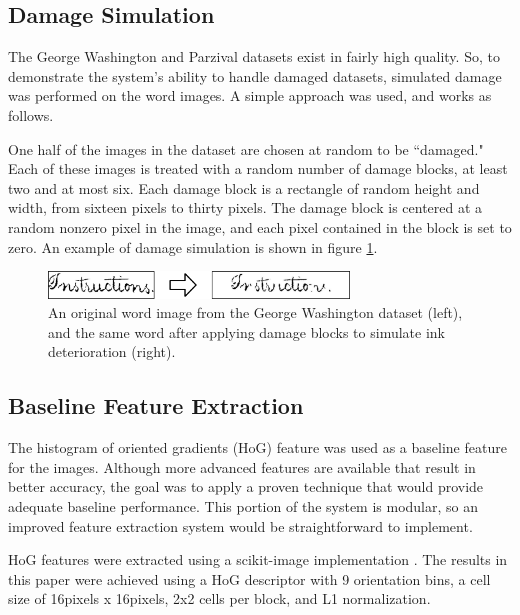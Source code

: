 \documentclass[final]{ukthesis}
\begin{document}
\subsection{Damage Simulation}
The George Washington and Parzival datasets exist in fairly high quality. So, to demonstrate the system's ability to handle damaged datasets, simulated damage was performed on the word images. A simple approach was used, and works as follows.

One half of the images in the dataset are chosen at random to be ``damaged." Each of these images is treated with a random number of damage blocks, at least two and at most six. Each damage block is a rectangle of random height and width, from sixteen pixels to thirty pixels. The damage block is centered at a random nonzero pixel in the image, and each pixel contained in the block is set to zero. An example of damage simulation is shown in figure \ref{fig:damage-simulation}.

\begin{figure}[h]
\begin{center}
\includegraphics[width=8cm]{damage-simulation}
\end{center}
\caption{An original word image from the George Washington dataset (left), and the same word after applying damage blocks to simulate ink deterioration (right).}
\label{fig:damage-simulation}
\end{figure}


\subsection{Baseline Feature Extraction}
The histogram of oriented gradients (HoG) feature was used as a baseline feature for the images. Although more advanced features are available that result in better accuracy, the goal was to apply a proven technique that would provide adequate baseline performance. This portion of the system is modular, so an improved feature extraction system would be straightforward to implement.

HoG features were extracted using a scikit-image implementation \cite{van2014scikit}. The results in this paper were achieved using a HoG descriptor with 9 orientation bins, a cell size of 16pixels x 16pixels, 2x2 cells per block, and L1 normalization.
\end{document}
